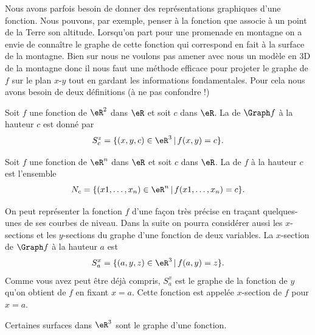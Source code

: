 Nous avons parfois besoin de donner des représentations graphiques d'une fonction. Nous pouvons, par exemple, penser à la fonction que associe à un point de la Terre son altitude. Lorsqu'on part pour une promenade en montagne on a envie de connaître le graphe de cette fonction qui correspond en fait à la surface de la montagne. Bien sur nous ne voulons pas amener avec nous un modèle en 3D de la montagne donc il nous faut une méthode efficace pour projeter le graphe de $f$ sur le plan $x$-$y$ tout en gardant les informations fondamentales. Pour cela nous avons besoin de deux définitions (à ne pas confondre !)
\begin{definition}
	Soit $f$ une fonction de $\eR^2$ dans $\eR$ et soit $c$ dans $\eR$.  La  de $\Graph f$ à la hauteur $c$ est donné par
\[
S^z_c=\{ (x,y,c)\in \eR^3\,|\, f(x,y)=c\}.
\]
\end{definition}

\begin{definition}\label{def_niveau}
	Soit $f$ une fonction de $\eR^n$ dans $\eR$ et soit $c$ dans $\eR$. La  de $f$ à la hauteur $c$ est l'ensemble
    \begin{equation}
        N_c=\{ (x1,\ldots, x_n)\in \eR^n\,|\, f(x1,\ldots, x_n)=c\}.
    \end{equation}
\end{definition}
On peut représenter la fonction $f$ d'une façon très précise en traçant quelques-unes de ses courbes de niveau.  Dans la suite on pourra considérer aussi les $x$-sections et les $y$-sections du graphe d'une fonction de deux variables. La $x$-section de $\Graph f$ à la hauteur $a$ est
\[
S^x_a=\{(a,y,z)\in\eR^3\,|\, f(a,y)=z\}.
\]
Comme vous avez peut être déjà compris, $S^x_a$ est le graphe de la fonction de $y$ qu'on obtient de $f$ en fixant $x=a$. Cette fonction est appelée $x$-section de $f$ pour $x=a$.

Certaines surfaces dans $\eR^3$ sont le graphe d'une fonction.

